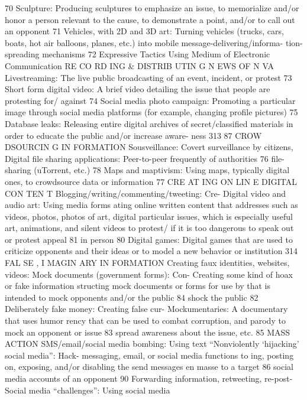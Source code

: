 \documentclass[twoside,a4paper,12pt,fleqn,openany]{extbook}
\begin{document}
 70
Sculpture: Producing sculptures to emphasize
an issue, to memorialize and/or honor a person
relevant to the cause, to demonstrate a point,
and/or to call out an opponent
 71
Vehicles, with 2D and 3D art: Turning vehicles
(trucks, cars, boats, hot air balloons, planes,
etc.) into mobile message-delivering/informa-
tion-spreading mechanisms
 72
Expressive Tactics Using Medium of Electronic Communication
RE CO RD ING & DISTRIB UTIN G N EWS OF N VA
Livestreaming: The live public broadcasting of
an event, incident, or protest
 73
Short form digital video: A brief video detailing
the issue that people are protesting for/
against
 74
Social media photo campaign: Promoting a
particular image through social media platforms
(for example, changing profile pictures)
 75
Database leaks: Releasing entire digital
archives of secret/classified materials in order
to educate the public and/or increase aware-
ness
 313
87
CROW DSOURCIN G IN FORMATION
Sousveillance: Covert surveillance by citizens,
 Digital file sharing applications: Peer-to-peer
frequently of authorities
 76
 file-sharing (uTorrent, etc.)
 78
Maps and maptivism: Using maps, typically digital
ones, to crowdsource data or information
 77
CRE AT ING ON LIN E DIGITAL CON TEN T
Blogging/writing/commenting/tweeting: Cre-
 Digital video and audio art: Using media forms
ating online written content that addresses
 such as videos, photos, photos of art, digital
particular issues, which is especially useful
 art, animations, and silent videos to protest/
if it is too dangerous to speak out or protest
 appeal
 81
in person
 80
Digital games: Digital games that are used to
criticize opponents and their ideas or to model
a new behavior or institution
 314
FAL SE , I MAGIN ARY IN FORMATION
Creating faux identities, websites, videos:
 Mock documents (government forms): Con-
Creating some kind of hoax or fake information
 structing mock documents or forms for use by
that is intended to mock opponents and/or
 the public
 84
shock the public
 82
Deliberately fake money: Creating false cur-
Mockumentaries: A documentary that uses humor
 rency that can be used to combat corruption,
and parody to mock an opponent or issue 83
 spread awareness about the issue, etc.
 85
MASS ACTION
SMS/email/social media bombing: Using text
 “Nonviolently ‘hijacking’ social media”: Hack-
messaging, email, or social media functions to
 ing, posting on, exposing, and/or disabling the
send messages en masse to a target
 86
 social media accounts of an opponent
 90
Forwarding information, retweeting, re-post-
 Social media “challenges”: Using social media
\end{document}
